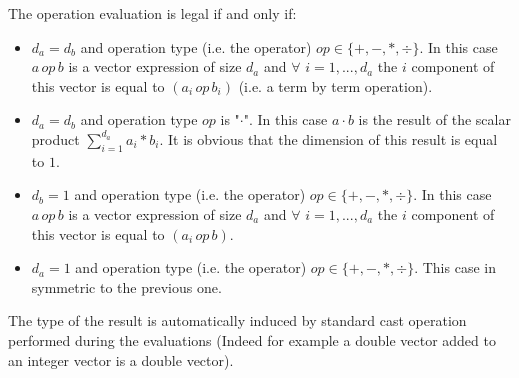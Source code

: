 \documentclass[a4paper,11pt] {article}
\begin{document}
The operation evaluation is legal if and only if:
\begin{itemize}
\item $d_a=d_b$ and operation type (i.e. the operator) $op \in \{ + , - , \ast , \div \}$. In this case $a \, op \, b$ is a vector expression of size $d_a$ and $\forall$ $i=1,...,d_a$ the $i$ component of this vector is equal to
$(a_i \, op \,b_i)$ (i.e. a term by term operation).
\item $d_a = d_b$ and operation type $op$ is "$\cdot$". In this case $a \cdot b$ is the result of the scalar product $\sum_{i =1}^{d_a} a_i \ast b_i$. It is obvious that the dimension of this result is equal to $1$.
\item $d_b=1$ and operation type (i.e. the operator) $op \in \{ + , - , \ast , \div \}$. In this case $a \, op \, b$ is a vector expression of size $d_a$ and $\forall$ $i=1,...,d_a$ the $i$ component of this vector is equal to
$(a_i \, op \,b)$.
\item $d_a=1$ and operation type (i.e. the operator) $op \in \{ + , - , \ast , \div \}$. This case in symmetric to the previous one.
\end{itemize}

The type of the result is automatically induced by standard cast operation performed during the evaluations (Indeed for example a double vector added to an integer vector is a double vector).  
\end{document}
